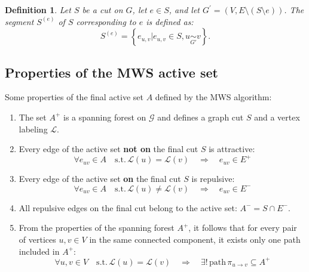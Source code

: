\documentclass[12pt]{article}
\newcommand\TODO[1]{\fbox{\textcolor{red}{TODO: #1}}}
\newtheorem{definition}{Definition}[section]
\begin{document}
\begin{definition}
Let $S$ be a cut on $G$, let $e\in S$,  and let $G^{'}=(V,E\setminus(S\setminus {e}))$. The segment $S^{(e)}$ of $S$ corresponding to $e$ is defined as:
\begin{equation}
S^{(e)} = \left\{ e_{u,v} \big| e_{u,v} \in S, u \underset{G'}{\sim}v   \right\}.
\end{equation}
\end{definition}
\TODO{Missing definition of energy $T$, MWS objective, algorithm, etc...}


\subsection{Properties of the MWS active set}

Some properties of the final active set $A$ defined by the MWS algorithm:
\begin{enumerate}
\item The set $A^{+}$ is a spanning forest on $\mathcal{G}$ and defines a graph cut $S$ and a vertex labeling $\mathcal{L}$.
\item Every edge of the active set \textbf{not on} the final cut $S$ is attractive:
\begin{equation}
\forall e_{uv}\in A \quad \mathrm{s.t.}\, \mathcal{L}(u)=\mathcal{L}(v) \quad \Longrightarrow \quad e_{uv} \in E^+
\end{equation}
\item Every edge of the active set \textbf{on} the final cut $S$ is repulsive:
\begin{equation}
\forall e_{uv} \in A \quad \mathrm{s.t.}\, \mathcal{L}(u)\neq\mathcal{L}(v) \quad \Longrightarrow \quad e_{uv} \in E^-
\end{equation}



\item All repulsive edges on the final cut belong to the active set: ${A^{-} = S \cap E^{-}}$. %
\item From the properties of the spanning forest $A^+$, it follows that for every pair of vertices $u,v\in V$ in the same connected component, it exists only one path included in $A^+$:
\begin{equation}
\forall u,v \in V\quad \mathrm{s.t.} \, \mathcal{L}(u)=\mathcal{L}(v)\quad  \Longrightarrow \quad\exists ! \, \mathrm{path} \, \pi_{u \rightarrow v}\subseteq A^+
\end{equation}
\end{enumerate}
\end{document}

